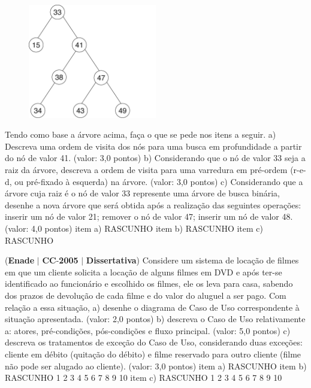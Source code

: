 \documentclass{exam}
\begin{document}
\begin{questions}
\begin{figure}[H]
	\begin{center}
		\includegraphics[width=0.5\textwidth]{CIENCIA_DA_COMPUTACAO_Prova2005-utf8_figuras/fig-0015.jpg}
	\end{center}
\end{figure}
Tendo como base a árvore acima, faça o que se pede nos itens a seguir.
a) Descreva uma ordem de visita dos nós para uma busca em profundidade a partir do nó de valor 41. (valor: 3,0 pontos)
b) Considerando que o nó de valor 33 seja a raiz da árvore, descreva a ordem de visita para uma varredura em pré-ordem
(r-e-d, ou pré-fixado à esquerda) na árvore. (valor: 3,0 pontos)
c) Considerando que a árvore cuja raiz é o nó de valor 33 represente uma árvore de busca binária, desenhe a nova árvore que será
obtida após a realização das seguintes operações: inserir um nó de valor 21; remover o nó de valor 47; inserir um nó de valor 48.
(valor: 4,0 pontos)
item a) RASCUNHO
item b) RASCUNHO
item c) RASCUNHO

\question (\textbf{Enade} $|$ \textbf{CC}-\textbf{2005} $|$ \textbf{Dissertativa})
Considere um sistema de locação de filmes em que um cliente solicita a locação de alguns filmes em DVD e após ter-se
identificado ao funcionário e escolhido os filmes, ele os leva para casa, sabendo dos prazos de devolução de cada filme e do
valor do aluguel a ser pago.
Com relação a essa situação,
a) desenhe o diagrama de Caso de Uso correspondente à situação apresentada. (valor: 2,0 pontos)
b) descreva o Caso de Uso relativamente a: atores, pré-condições, pós-condições e fluxo principal. (valor: 5,0 pontos)
c) descreva os tratamentos de exceção do Caso de Uso, considerando duas exceções: cliente em débito (quitação do débito) e filme
reservado para outro cliente (filme não pode ser alugado ao cliente). (valor: 3,0 pontos)
item a) RASCUNHO
item b) RASCUNHO
1
2
3
4
5
6
7
8
9
10
item c) RASCUNHO
1
2
3
4
5
6
7
8
9
10


\end{questions}
\end{document}
